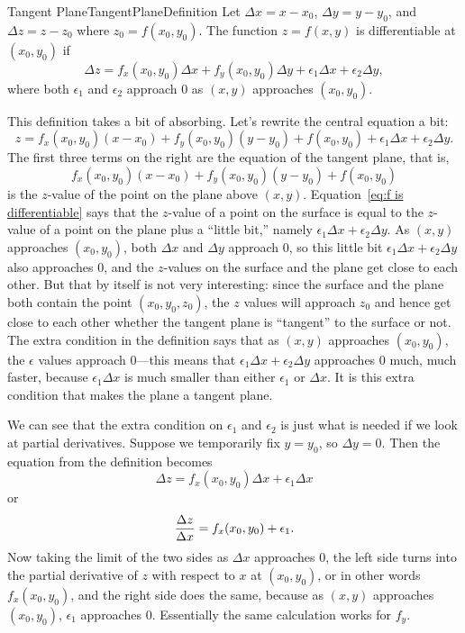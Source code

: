 \begin{definition}{Tangent Plane}{TangentPlaneDefinition}
Let $\Delta x=x-x_0$, $\Delta y=y-y_0$, and $\Delta z=z-z_0$
where $z_0=f(x_0,y_0)$. The
function $z=f(x,y)$ is differentiable at
$(x_0,y_0)$ if
$$\Delta z=f_x(x_0,y_0)\Delta x+f_y(x_0,y_0)\Delta y+\epsilon_1\Delta
x + \epsilon_2\Delta y,$$ where both $\epsilon_1$ and $\epsilon_2$
approach 0 as $(x,y)$ approaches $(x_0,y_0)$.
\end{definition}

This definition takes a bit of absorbing. Let's rewrite the central
equation a bit:
\begin{equation}\label{eq:f is differentiable}
z=f_x(x_0,y_0)(x-x_0)+f_y(x_0,y_0)(y-y_0)+f(x_0,y_0)+
\epsilon_1\Delta x + \epsilon_2\Delta y.
\end{equation}
The first three terms on
the right are the equation of the tangent plane, that is,
$$f_x(x_0,y_0)(x-x_0)+f_y(x_0,y_0)(y-y_0)+f(x_0,y_0)$$
 is the $z$-value
of the point on the plane above $(x,y)$. 
Equation~\ref{eq:f is differentiable} says that
the $z$-value of a point on the surface is equal to the $z$-value of a
point on the plane plus a ``little bit,'' namely $\epsilon_1\Delta x +
\epsilon_2\Delta y$. As $(x,y)$ approaches $(x_0,y_0)$, both $\Delta
x$ and $\Delta y$ approach 0, so this little bit $\epsilon_1\Delta x +
\epsilon_2\Delta y$ also approaches 0, and the $z$-values on the
surface and the plane get close to each other. But that by itself is
not very interesting: since the surface and the plane both contain the
point $(x_0,y_0,z_0)$, the $z$ values will approach $z_0$ and hence
get close to each other whether the tangent plane is ``tangent'' to
the surface or not. The extra condition in the definition says that as
$(x,y)$ approaches $(x_0,y_0)$, the $\epsilon$ values approach
0---this means that $\epsilon_1\Delta x + \epsilon_2\Delta y$
approaches 0 much, much faster, because $\epsilon_1\Delta x$ is much
smaller than either $\epsilon_1$ or $\Delta x$. It is this extra
condition that makes the plane a tangent plane.

We can see that the extra condition on $\epsilon_1$ and $\epsilon_2$
is just what is needed if we look at partial derivatives. Suppose we
temporarily fix $y=y_0$, so $\Delta y=0$. Then the equation from the
definition becomes
$$\Delta z=f_x(x_0,y_0)\Delta x+\epsilon_1\Delta x$$
or
$${\Delta z\over\Delta x}=f_x(x_0,y_0)+\epsilon_1.$$
Now taking the limit of the two sides as $\Delta x$ approaches 0, the
left side turns into the partial derivative of $z$ with respect to
$x$ at $(x_0,y_0)$, or in other words $f_x(x_0,y_0)$, and the right
side does the same, because as $(x,y)$ approaches $(x_0,y_0)$,
$\epsilon_1$ approaches 0. Essentially the same calculation works for 
$f_y$.


